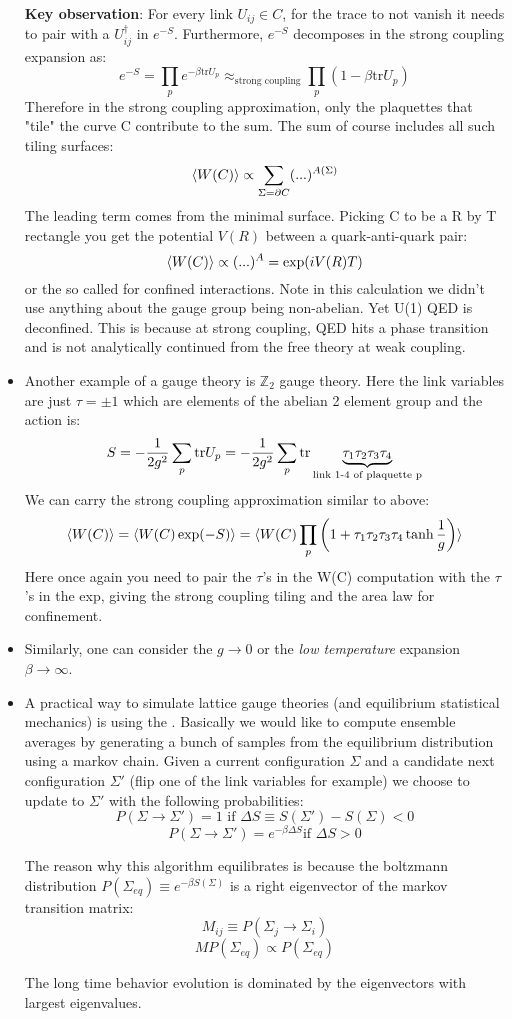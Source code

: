\documentclass[11pt]{scrartcl}
\begin{document}
\begin{itemize}
	\textbf{Key observation}: For every link $U_{ij} \in C$, for the trace to not vanish it needs to pair with a $U^\dagger_{ij}$ in $e^{-S}$.  Furthermore, $e^{-S}$ decomposes in the strong coupling expansion as:
	\[e^{-S} = \prod_{p} e^{- \beta \mathrm{tr}U_p} \approx_{\text{strong coupling}} \prod_{p} (1 - \beta \mathrm{tr} U_p) \]
	Therefore in the strong coupling approximation, only the plaquettes that "tile" the curve C contribute to the sum.  The sum of course includes all such tiling surfaces:
	\[ \braket{W(C)} \propto \sum_{\Sigma = \partial C}(...)^{A(\Sigma)} \] 
	The leading term comes from the minimal surface.  Picking C to be a R by T rectangle you get the potential $V(R)$ between a quark-anti-quark pair:
	\[ \braket{W(C)} \propto (...)^A = \exp(i V(R)T) \] 
	or the so called  for confined interactions.  Note in this calculation we didn't use anything about the gauge group being non-abelian.  Yet U(1) QED is deconfined.  This is because at strong coupling, QED hits a phase transition and is not analytically continued from the free theory at weak coupling.
		\item Another example of a gauge theory is $\mathbb{Z}_2$ gauge theory.  Here the link variables are just $\tau = \pm 1$ which are elements of the abelian 2 element group and the action is:
	\[ S = - {1 \over 2 g^2} \sum_p \mathrm{tr} U_p = - {1 \over 2 g^2} \sum_p \mathrm{tr} \underbrace{\tau_1 \tau_2 \tau_3 \tau_4}_{\text{link 1-4 of plaquette p}} \]
	We can carry the strong coupling approximation  similar to above:
	\[ \braket{W(C)} = \braket{ W(C) \exp (-S)} = \braket{W(C) \prod_{p} \left(1 + \tau_1 \tau_2 \tau_3 \tau_4  \tanh{1 \over g} \right)} \]
	Here once again you need to pair the $\tau$'s in the W(C) computation with the $\tau$'s in the exp, giving the strong coupling tiling and the area law for confinement.
	\item Similarly, one can consider the  $g\rightarrow 0$ or the \emph{low temperature} expansion $\beta \rightarrow \infty$.
	\item A practical way to simulate lattice gauge theories (and equilibrium statistical mechanics) is using the .  Basically we would like to compute ensemble averages by generating a bunch of samples from the equilibrium distribution using a markov chain. 
	Given a current configuration $\Sigma$ and a candidate next configuration $\Sigma'$ (flip one of the link variables for example) we choose to update to $\Sigma'$ with the following probabilities:
	\[ P(\Sigma \rightarrow \Sigma') = 1 \text{ if } \Delta S \equiv S(\Sigma') - S(\Sigma) < 0 \]
	\[P(\Sigma \rightarrow \Sigma') = e^{-\beta \Delta S} \text{if } \Delta S > 0 \]
	
	The reason why this algorithm equilibrates is because the boltzmann distribution $P(\Sigma_{eq}) \equiv e^{- \beta S(\Sigma)}$ is a right eigenvector of the markov transition matrix:
	\[M_{ij} \equiv P(\Sigma_j \rightarrow \Sigma_i) \]
	\[ M P(\Sigma_{eq}) \propto  P(\Sigma_{eq}) \]
	
	The long time behavior evolution is dominated by the eigenvectors with largest eigenvalues.
	
\end{itemize}
\end{document}
